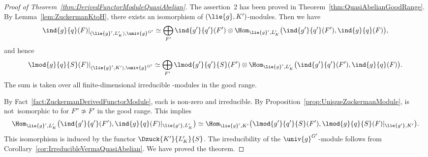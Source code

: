 \begin{proof}[Proof of Theorem~\ref{thm:DerivedFunctorModuleQuasiAbelian}]
	The assertion~2 has been proved in Theorem~\ref{thm:QuasiAbelianGoodRange}.
	By Lemma~\ref{lem:ZuckermanKtoH}, there exists an isomorphism  of $(\lie{g}, K')$-modules.
	Then we have
	\begin{align*}
		\ind{g}{q}(F)|_{(\lie{g}', L'_K), \univ{g}^{G'}} \simeq \bigoplus_{F'} \ind{g'}{q'}(F') \otimes \Hom_{\lie{g}', L'_K}\bigl(\ind{g'}{q'}(F'), \ind{g}{q}(F)\bigr),
	\end{align*}
	and hence
	\begin{align*}
		\lmod{g}{q}{S}(F)|_{(\lie{g}', K'), \univ{g}^{G'}} \simeq \bigoplus_{F'} \lmod{g'}{q'}{S}(F') \otimes \Hom_{\lie{g}', L'_K}\bigl(\ind{g'}{q'}(F'), \ind{g}{q}(F)\bigr).
	\end{align*}
	The sum is taken over all finite-dimensional irreducible -modules in the good range.
	
	By Fact~\ref{fact:ZuckermanDerivedFunctorModule}, each  is non-zero and irreducible.
	By Proposition~\ref{prop:UniqueZuckermanModule},  is not~isomorphic to  for $F''\not \simeq F'$ in the good range.
	This implies
	\begin{align*}
		\Hom_{\lie{g}', L'_K}\bigl(\ind{g'}{q'}(F'), \ind{g}{q}(F)|_{\lie{g'}, L'_K}\bigr) \simeq \Hom_{\lie{g}', K'}\bigl(\lmod{g'}{q'}{S}(F'), \lmod{g}{q}{S}(F)|_{\lie{g'}, K'}\bigr).
	\end{align*}
	This isomorphism is induced by the functor $\Dzuck{K'}{L'_K}{S}$.
	The irreducibility of the $\univ{g}^{G'}$-module follows from Corollary~\ref{cor:IrreducibleVermaQuasiAbelian}.
	We have proved the theorem.
\end{proof}
